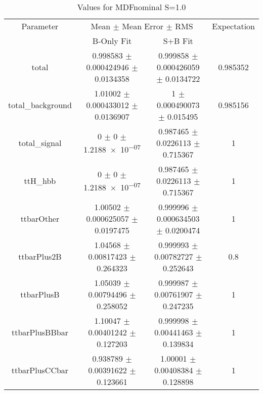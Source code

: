 \begin{table}
\centering
\caption{Values for MDFnominal S=1.0}
\begin{tabular}{cccc}
\toprule
Parameter & \multicolumn{2}{c}{Mean $\pm$ Mean Error $\pm$ RMS} & Expectation\\
 & B-Only Fit & S+B Fit & \\
\midrule
total & \num{0.998583} $\pm$ \num{0.000424946} $\pm$ \num{0.0134358} & \num{0.999858} $\pm$ \num{0.000426059} $\pm$ \num{0.0134722} & \num{0.985352}\\
total\_background & \num{1.01002} $\pm$ \num{0.000433012} $\pm$ \num{0.0136907} & \num{1} $\pm$ \num{0.000490073} $\pm$ \num{0.015495} & \num{0.985156}\\
total\_signal & \num{0} $\pm$ \num{0} $\pm$ \num{1.2188e-07} & \num{0.987465} $\pm$ \num{0.0226113} $\pm$ \num{0.715367} & \num{1}\\
ttH\_hbb & \num{0} $\pm$ \num{0} $\pm$ \num{1.2188e-07} & \num{0.987465} $\pm$ \num{0.0226113} $\pm$ \num{0.715367} & \num{1}\\
ttbarOther & \num{1.00502} $\pm$ \num{0.000625057} $\pm$ \num{0.0197475} & \num{0.999996} $\pm$ \num{0.000634503} $\pm$ \num{0.0200474} & \num{1}\\
ttbarPlus2B & \num{1.04568} $\pm$ \num{0.00817423} $\pm$ \num{0.264323} & \num{0.999993} $\pm$ \num{0.00782727} $\pm$ \num{0.252643} & \num{0.8}\\
ttbarPlusB & \num{1.05039} $\pm$ \num{0.00794496} $\pm$ \num{0.258052} & \num{0.999987} $\pm$ \num{0.00761907} $\pm$ \num{0.247235} & \num{1}\\
ttbarPlusBBbar & \num{1.10047} $\pm$ \num{0.00401242} $\pm$ \num{0.127203} & \num{0.999998} $\pm$ \num{0.00441463} $\pm$ \num{0.139834} & \num{1}\\
ttbarPlusCCbar & \num{0.938789} $\pm$ \num{0.00391622} $\pm$ \num{0.123661} & \num{1.00001} $\pm$ \num{0.00408384} $\pm$ \num{0.128898} & \num{1}\\
\bottomrule
\end{tabular}
\end{table}